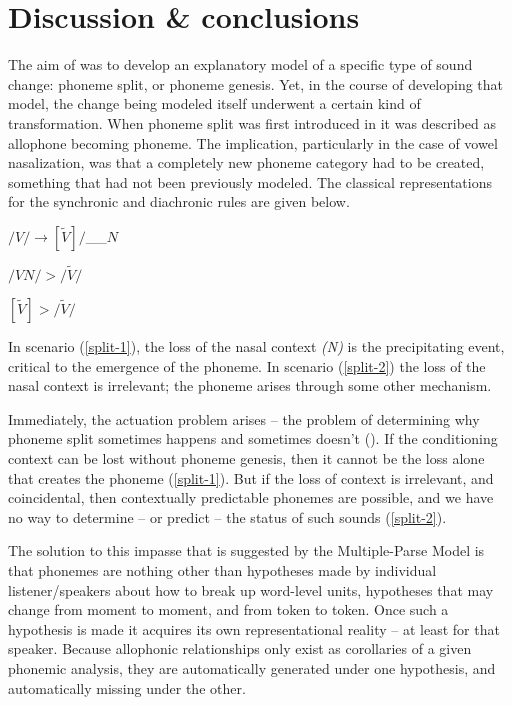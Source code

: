 \chapter{Discussion \& conclusions}\label{ch:Summary}

The aim of  was to develop an explanatory
model of a specific type of sound change: phoneme split, or phoneme
genesis. Yet, in the course of developing that model, the change being
modeled itself underwent a certain kind of transformation. When phoneme
split was first introduced in  it was
described as allophone becoming phoneme. The implication, particularly
in the case of vowel nasalization, was that a completely new phoneme
category had to be created, something that had not been previously
modeled. The classical representations for the synchronic and diachronic
rules are given below.
\begin{covexample}
\label{allophonic rule}$/V/\rightarrow[\tilde{V}]/$\_\_$N$
\end{covexample}
\begin{covsubexamples}
\item \label{split-1}$/VN/>/\tilde{V}/$
\item \label{split-2}$[\tilde{V}]>/\tilde{V}/$
\end{covsubexamples}
In scenario (\ref{split-1}), the loss of the nasal context \emph{(N)}
is the precipitating event, critical to the emergence of the phoneme.
In scenario (\ref{split-2}) the loss of the nasal context is irrelevant;
the phoneme arises through some other mechanism.

Immediately, the actuation problem arises – the problem of determining
why phoneme split sometimes happens and sometimes doesn't (\citealt{Labov1968}).
If the conditioning context can be lost without phoneme genesis, then
it cannot be the loss alone that creates the phoneme (\ref{split-1}).
But if the loss of context is irrelevant, and coincidental, then contextually
predictable phonemes are possible, and we have no way to determine
– or predict – the status of such sounds (\ref{split-2}).

The solution to this impasse that is suggested by the Multiple-Parse
Model is that phonemes are nothing other than hypotheses made by individual
listener/speakers about how to break up word-level units, hypotheses
that may change from moment to moment, and from token to token. Once
such a hypothesis is made it acquires its own representational reality
– at least for that speaker. Because allophonic relationships only
exist as corollaries of a given phonemic analysis, they are automatically
generated under one hypothesis, and automatically missing under the
other. 

